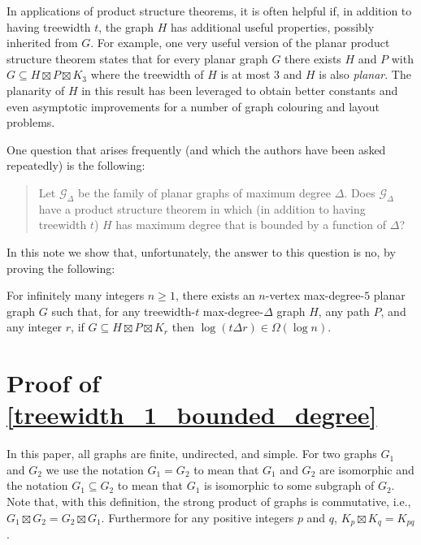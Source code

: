 \documentclass{patmorin}
\begin{document}
In applications of product structure theorems, it is often helpful if, in addition to having treewidth $t$, the graph $H$ has additional useful properties, possibly inherited from $G$.  For example, one very useful version of the planar product structure theorem states that for every planar graph $G$ there exists $H$ and $P$ with $G\subseteq H\boxtimes P\boxtimes K_3$ where the treewidth of $H$ is at most $3$ and $H$ is also \emph{planar}.  The planarity of $H$ in this result has been leveraged to obtain better constants and even asymptotic improvements for a number of graph colouring and layout problems.

One question that arises frequently (and which the authors have been asked repeatedly) is the following:
\begin{quote}
  Let $\mathcal{G}_\Delta$ be the family of planar graphs of maximum degree $\Delta$.  Does $\mathcal{G}_\Delta$ have a product structure theorem in which (in addition to having treewidth $t$) $H$ has maximum degree that is bounded by a function of $\Delta$?
\end{quote}
In this note we show that, unfortunately, the answer to this question is no, by proving the following:

\begin{thm}\label{treewidth_1_bounded_degree}
  For infinitely many integers $n\ge 1$, there exists an $n$-vertex max-degree-$5$ planar graph $G$ such that, for any treewidth-$t$ max-degree-$\Delta$ graph $H$, any path $P$, and any integer $r$,  if $G\subseteq H\boxtimes P\boxtimes K_r$ then $\log(t\Delta r)\in\Omega(\log n)$.
\end{thm}

\section{Proof of \cref{treewidth_1_bounded_degree}}

In this paper, all graphs are finite, undirected, and simple.  For two graphs $G_1$ and $G_2$ we use the notation $G_1=G_2$ to mean that $G_1$ and $G_2$ are isomorphic and the notation $G_1\subseteq G_2$ to mean that $G_1$ is isomorphic to some subgraph of $G_2$.  Note that, with this definition, the strong product of graphs is commutative, i.e., $G_1\boxtimes G_2=G_2\boxtimes G_1$.  Furthermore for any positive integers $p$ and $q$, $K_{p}\boxtimes K_{q}=K_{pq}$.
\end{document}
